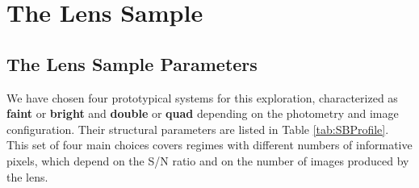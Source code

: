 \documentclass[a4paper,11pt]{article}
\begin{document}
\section{The Lens Sample}

\subsection{The Lens Sample Parameters}

We have chosen four prototypical systems for this exploration, characterized as \textbf{faint} or \textbf{bright} and \textbf{double} or \textbf{quad} depending on the photometry and image configuration. Their structural parameters are listed in Table \ref{tab:SBProfile}. This set of four main choices covers regimes with different numbers of informative pixels, which depend on the S/N ratio and on the number of images produced by the lens.
\end{document}
